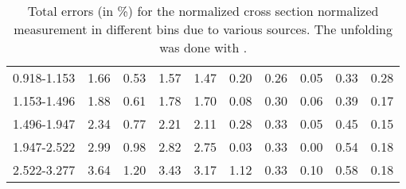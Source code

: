 \begin{table}
\begin{center}
\begin{tabular}{@{}l l l l l l l l l l@{}}
            0.918-1.153     &  1.66   &  0.53   &  1.57         &  1.47      &  0.20    &  0.26  &  0.05       &  0.33  &  0.28  \\
            1.153-1.496     &  1.88   &  0.61   &  1.78         &  1.70      &  0.08    &  0.30  &  0.06       &  0.39  &  0.17  \\
            1.496-1.947     &  2.34   &  0.77   &  2.21         &  2.11      &  0.28    &  0.33  &  0.05       &  0.45  &  0.15  \\
            1.947-2.522     &  2.99   &  0.98   &  2.82         &  2.75      &  0.03    &  0.33  &  0.00       &  0.54  &  0.18  \\
            2.522-3.277     &  3.64   &  1.20   &  3.43         &  3.17      &  1.12    &  0.33  &  0.10       &  0.58  &  0.18  \\
            \bottomrule
        \end{tabular}
    \end{center}
    \caption[
        Total errors (in \%) for the normalized cross section normalized
        measurement with \POWHEG unfolding.
    ]{
        Total errors (in \%) for the normalized cross section normalized
        measurement in different \phistar bins due to various sources. The
        unfolding was done with \POWHEG.
    }
    \label{tab:sys_uncert_norm_powheg}
\end{table}

